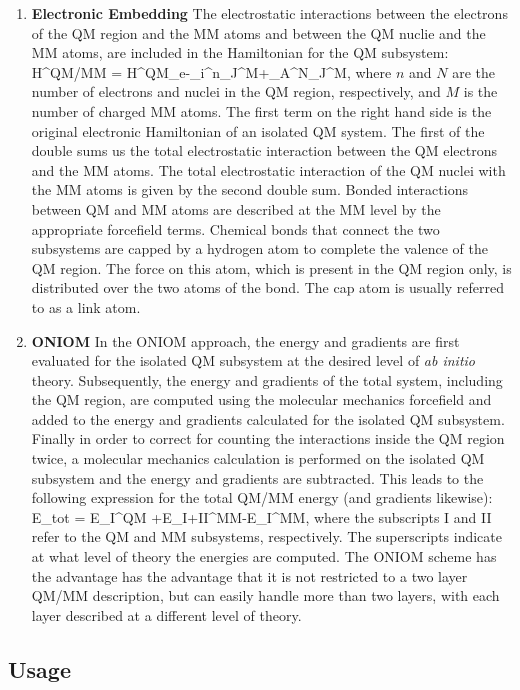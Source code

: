 \begin{enumerate}
\item{\textbf{Electronic Embedding}} The electrostatic interactions
between the electrons of the QM region and the MM atoms and between
the QM nuclie and the MM atoms, are included in the Hamiltonian for
the QM subsystem: \beq H^{QM/MM} =
H^{QM}_e-\sum_i^n\sum_J^M+\sum_A^N\sum_J^M,
\eeq where $n$ and $N$ are the number of electrons and nuclei in the
QM region, respectively, and $M$ is the number of charged MM
atoms. The first term on the right hand side is the original
electronic Hamiltonian of an isolated QM system. The first of the
double sums us the total electrostatic interaction between the QM
electrons and the MM atoms. The total electrostatic interaction of the
QM nuclei with the MM atoms is given by the second double sum. Bonded
interactions between QM and MM atoms are described at the MM level by
the appropriate forcefield terms. Chemical bonds that connect the two
subsystems are capped by a hydrogen atom to complete the valence of
the QM region. The force on this atom, which is present in the QM
region only, is distributed over the two atoms of the bond. The cap
atom is usually referred to as a link atom.

\item{\textbf{ONIOM}} In the ONIOM approach, the energy and gradients
are first evaluated for the isolated QM subsystem at the desired level
of {\it{ab initio}} theory. Subsequently, the energy and gradients of
the total system, including the QM region, are computed using the
molecular mechanics forcefield and added to the energy and gradients
calculated for the isolated QM subsystem. Finally in order to correct
for counting the interactions inside the QM region twice, a molecular
mechanics calculation is performed on the isolated QM subsystem and
the energy and gradients are subtracted. This leads to the following
expression for the total QM/MM energy (and gradients likewise): \beq
E_{tot} = E_{I}^{QM}
+E_{I+II}^{MM}-E_{I}^{MM}, \eeq where the
subscripts I and II refer to the QM and MM subsystems,
respectively. The superscripts indicate at what level of theory the
energies are computed. The ONIOM scheme has the advantage has the
advantage that it is not restricted to a two layer QM/MM description,
but can easily handle more than two layers, with each layer described
at a different level of theory.
\end{enumerate}

\subsection{Usage}


